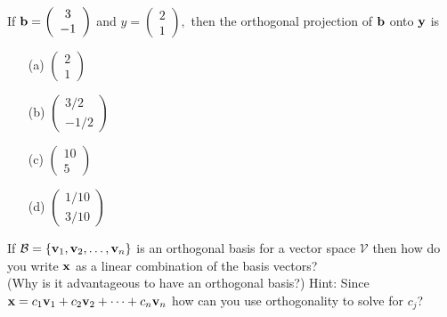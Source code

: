 \begin{problem}
    If ${\bf b} = \left( \begin{array}{c} 3 \\ -1  \end{array} \right)$ and $y = \left(
    \begin{array}{c} 2 \\ 1  \end{array} \right),$ then the orthogonal projection of ${\bf b}$
    onto ${\bf y}$ is

\begin{enumerate}
    \item[(a)] $\left( \begin{array}{c} 2 \\ 1  \end{array} \right)$
    \item[(b)] $\left( \begin{array}{c} 3/2 \\ -1/2 \end{array} \right)$
    \item[(c)] $\left( \begin{array}{c} 10 \\ 5  \end{array} \right)$
    \item[(d)] $\left( \begin{array}{c} 1/10 \\ 3/10  \end{array} \right)$
\end{enumerate}

\end{problem}
%             


\begin{problem}
    If $\mathcal{B} = \{{\bf v}_1, {\bf v}_2, \ldots, {\bf v}_n\}$ is an orthogonal basis for a vector
    space $\mathcal{V}$ then how do you write ${\bf x}$ as a linear combination of the basis vectors?\\
    (Why is it advantageous to have an orthogonal basis?) 
    Hint: Since ${\bf x} = c_1 {\bf v}_1 + c_2 {\bf v}_2 + \cdots + c_n {\bf v}_n$ how can you use
    orthogonality to solve for $c_j$?
\end{problem}

